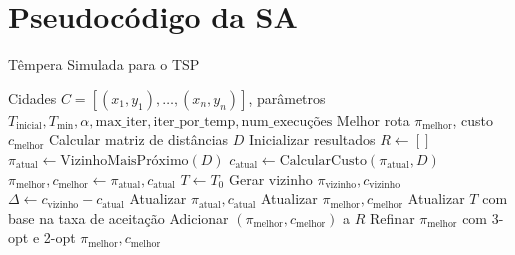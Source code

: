 \documentclass[12pt]{article}
\begin{document}
\section{Pseudocódigo da SA}\label{app:sa}
\begin{algorithm}
    \caption{Têmpera Simulada para o TSP}
    \begin{algorithmic}[1]
        \Require Cidades \(C = [(x_1, y_1), \ldots, (x_n, y_n)]\), parâmetros \(T_{\text{inicial}}, T_{\text{min}}, \alpha, \text{max\_iter}, \text{iter\_por\_temp}, \text{num\_execuções}\)
        \Ensure Melhor rota \(\pi_{\text{melhor}}\), custo \(c_{\text{melhor}}\)
        \State Calcular matriz de distâncias \(D\)
        \State Inicializar resultados \(R \gets []\)
            \State \(\pi_{\text{atual}} \gets \text{VizinhoMaisPróximo}(D)\)
            \State \(c_{\text{atual}} \gets \text{CalcularCusto}(\pi_{\text{atual}}, D)\)
            \State \(\pi_{\text{melhor}}, c_{\text{melhor}} \gets \pi_{\text{atual}}, c_{\text{atual}}\)
            \State \(T \gets T_0\)
                \State Gerar vizinho \(\pi_{\text{vizinho}}, c_{\text{vizinho}}\)
                \State \(\Delta \gets c_{\text{vizinho}} - c_{\text{atual}}\)
                    \State Atualizar \(\pi_{\text{atual}}, c_{\text{atual}}\)
                        \State Atualizar \(\pi_{\text{melhor}}, c_{\text{melhor}}\)
                    \EndIf
                \EndIf
                \State Atualizar \(T\) com base na taxa de aceitação
            \EndWhile
            \State Adicionar \((\pi_{\text{melhor}}, c_{\text{melhor}})\) a \(R\)
        \EndFor
        \State Refinar \(\pi_{\text{melhor}}\) com 3-opt e 2-opt
        \State \Return \(\pi_{\text{melhor}}, c_{\text{melhor}}\)
    \end{algorithmic}
\end{algorithm}
\end{document}
